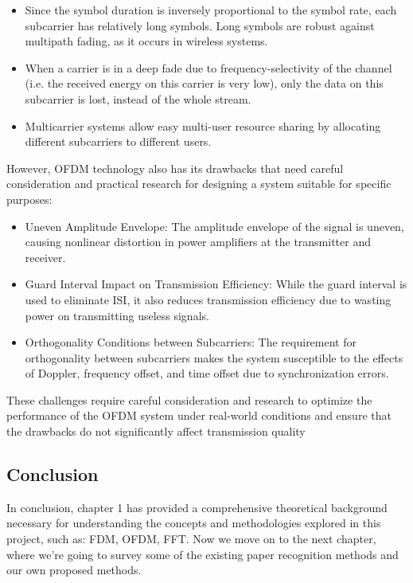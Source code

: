 \begin{itemize}
    \item Since the symbol duration is inversely proportional to the symbol rate, each subcarrier has relatively long symbols. Long symbols are robust against multipath fading, as it occurs in wireless systems.
    \item When a carrier is in a deep fade due to frequency-selectivity of the channel (i.e. the received energy on this carrier is very low), only the data on this subcarrier is lost, instead of the whole stream.
    \item Multicarrier systems allow easy multi-user resource sharing by allocating different subcarriers to different users.
\end{itemize}
However, OFDM technology also has its drawbacks that need careful consideration and practical research for designing a system suitable for specific purposes:
\begin{itemize}
    \item Uneven Amplitude Envelope: The amplitude envelope of the signal is uneven, causing nonlinear distortion in power amplifiers at the transmitter and receiver.
    \item Guard Interval Impact on Transmission Efficiency: While the guard interval is used to eliminate ISI, it also reduces transmission efficiency due to wasting power on transmitting useless signals.
    \item Orthogonality Conditions between Subcarriers: The requirement for orthogonality between subcarriers makes the system susceptible to the effects of Doppler, frequency offset, and time offset due to synchronization errors.
\end{itemize}
These challenges require careful consideration and research to optimize the performance of the OFDM system under real-world conditions and ensure that the drawbacks do not significantly affect transmission quality

\subsection{Conclusion}

In conclusion, chapter 1 has provided a comprehensive theoretical background necessary for understanding the concepts and methodologies explored in this project, such as: FDM, OFDM, FFT. Now we move on to the next chapter, where we're going to survey some of the existing paper recognition methods and our own proposed methods.
